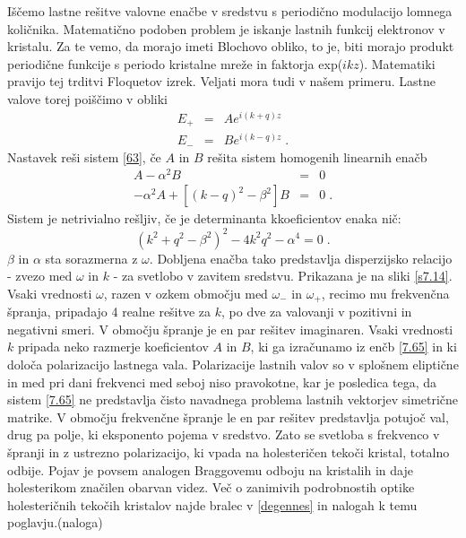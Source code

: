 \documentclass[11pt,fleqn]{book} %
\begin{document}
Iščemo lastne rešitve valovne enačbe v sredstvu s periodično modulacijo
lomnega količnika. Matematično podoben problem je iskanje lastnih
funkcij elektronov v kristalu. Za te vemo, da morajo imeti Blochovo
obliko, to je, biti morajo produkt periodične funkcije s periodo kristalne
mreže in faktorja exp($ikz$). Matematiki pravijo tej trditvi Floquetov
izrek. Veljati mora tudi v našem primeru. Lastne valove torej poiščimo
v obliki 
\begin{eqnarray}
E_{+} & = & Ae^{i(k+q)z}\nonumber \\
E_{-} & = & Be^{i(k-q)z}\;.
\end{eqnarray}
 Nastavek reši sistem \ref{63}, če $A$ in $B$ rešita sistem homogenih
linearnih enačb 
\begin{eqnarray}
[(k+q)^{2}-\beta^{2}]A-\alpha^{2}B & = & 0\nonumber \\
-\alpha^{2}A+[(k-q)^{2}-\beta^{2}]B & = & 0\;.
\end{eqnarray}
 Sistem je netrivialno rešljiv, če je determinanta kkoeficientov enaka
nič: 
\begin{equation}
(k^{2}+q^{2}-\beta^{2})^{2}-4k^{2}q^{2}-\alpha^{4}=0\;.\label{7.66}
\end{equation}
 $\beta$ in $\alpha$ sta sorazmerna z $\omega$. Dobljena enačba
tako predstavlja disperzijsko relacijo - zvezo med $\omega$ in $k$
- za svetlobo v zavitem sredstvu. Prikazana je na sliki \ref{s7.14}.
Vsaki vrednosti $\omega$, razen v ozkem območju med $\omega_{-}$
in $\omega_{+}$, recimo mu frekvenčna špranja, pripadajo 4 realne
rešitve za $k$, po dve za valovanji v pozitivni in negativni smeri.
V območju špranje je en par rešitev imaginaren. Vsaki vrednosti $k$
pripada neko razmerje koeficientov $A$ in $B$, ki ga izračunamo
iz enčb \ref{7.65} in ki določa polarizacijo lastnega vala. Polarizacije
lastnih valov so v splošnem eliptične in med pri dani frekvenci med
seboj niso pravokotne, kar je posledica tega, da sistem \ref{7.65}
ne predstavlja čisto navadnega problema lastnih vektorjev simetrične
matrike. V območju frekvenčne špranje le en par rešitev predstavlja
potujoč val, drug pa polje, ki eksponento pojema v sredstvo. Zato
se svetloba s frekvenco v špranji in z ustrezno polarizacijo, ki vpada
na holesteričen tekoči kristal, totalno odbije. Pojav je povsem analogen
Braggovemu odboju na kristalih in daje holesterikom značilen obarvan
videz. Več o zanimivih podrobnostih optike holesteričnih tekočih kristalov
najde bralec v \ref{degennes} in nalogah k temu poglavju.(naloga)
\end{document}
